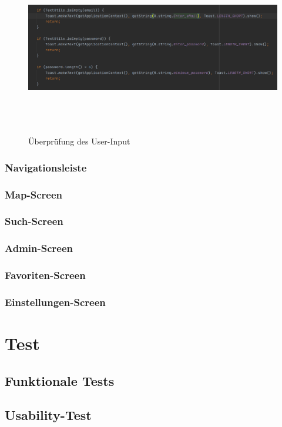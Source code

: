 \documentclass[12pt, a4paper, oneside]{article}
\begin{document}
\begin{figure}
\includegraphics[width=1\textwidth, height=7cm]{SignUp_check.png}
\centering
\label{input_check}
\caption{Überprüfung des User-Input}
\end{figure}
\subsubsection{Navigationsleiste}
\subsubsection{Map-Screen}
\subsubsection{Such-Screen}
\subsubsection{Admin-Screen}
\subsubsection{Favoriten-Screen}
\subsubsection{Einstellungen-Screen}

\section{Test}
\subsection{Funktionale Tests}
\subsection{Usability-Test}
\newpage
\end{document}
